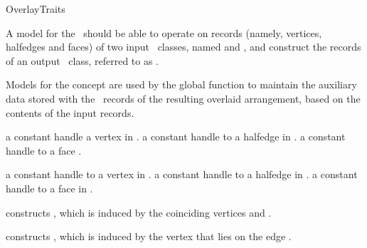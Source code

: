 
\ccRefPageBegin

\begin{ccRefConcept}{OverlayTraits}

A model for the \ccRefName\ should be able to operate on records (namely,
vertices, halfedges and faces) of two input \dcel\ classes, named
 and , and construct the records of an output \dcel\
class, referred to as .

Models for the concept are used by the global  function to
maintain the auxiliary data stored with the \dcel\ records of the resulting
overlaid arrangement, based on the contents of the input records.

\ccTypes

{a constant handle a vertex in .}
\ccGlue
{}
{a constant handle to a halfedge in .}
\ccGlue
{}
{a constant handle to a face .}

{a constant handle to a vertex in .}
\ccGlue
{}
{a constant handle to a halfedge in .}
\ccGlue
{}
{a constant handle to a face in .}

\ccGlue
{}
\ccGlue
{}


    
    {constructs , which is induced by the coinciding vertices 
     \ccc{v1} and \ccc{v2}.}

    {constructs , which is induced by the vertex  that lies on
     the edge \ccc{e2}.}


\end{ccRefConcept}
